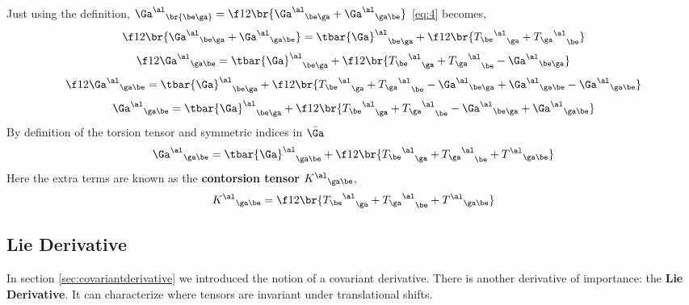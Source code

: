\documentclass{article}
\begin{document}
Just using the definition, ${\Ga^\al}_{\br{\be\ga}} = \f12 \br{{\Ga^\al}_{\be\ga} + {\Ga^\al}_{\ga\be}}$ \eqref{eq:4} becomes,
\[  \f12 \br{{\Ga^\al}_{\be\ga} + {\Ga^\al}_{\ga\be}} = {\tbar{\Ga}^\al}_{\be\ga} + \f12\br{{{T_{\be}}^{\al}}_\ga  + {{T_{\ga}}^{\al}}_\be} \]
\[  \f12 {\Ga^\al}_{\ga\be} = {\tbar{\Ga}^\al}_{\be\ga} + \f12\br{{{T_{\be}}^{\al}}_\ga  + {{T_{\ga}}^{\al}}_\be - {\Ga^\al}_{\be\ga} } \]
\[  \f12 {\Ga^\al}_{\ga\be} = {\tbar{\Ga}^\al}_{\be\ga} + \f12\br{{{T_{\be}}^{\al}}_\ga  + {{T_{\ga}}^{\al}}_\be - {\Ga^\al}_{\be\ga} + {\Ga^\al}_{\ga\be} - {\Ga^\al}_{\ga\be} } \]
\[  {\Ga^\al}_{\ga\be} = {\tbar{\Ga}^\al}_{\be\ga} + \f12\br{{{T_{\be}}^{\al}}_\ga  + {{T_{\ga}}^{\al}}_\be - {\Ga^\al}_{\be\ga} + {\Ga^\al}_{\ga\be} } \]
By definition of the torsion tensor and symmetric indices in $\bar{\Ga}$
\[  {\Ga^\al}_{\ga\be} = {\tbar{\Ga}^\al}_{\ga\be} + \f12\br{{{T_{\be}}^{\al}}_\ga  + {{T_{\ga}}^{\al}}_\be + {T^\al}_{\ga\be} } \]
Here the extra terms are known as the \textbf{contorsion tensor} ${K^{\al}}_{\ga\be}$,
\[{K^{\al}}_{\ga\be} = \f12\br{{{T_{\be}}^{\al}}_\ga  + {{T_{\ga}}^{\al}}_\be + {T^\al}_{\ga\be} } \]
\subsection{Lie Derivative}
\label{sec:liederivative}
In section \eqref{sec:covariantderivative} we introduced the notion of a covariant derivative. There is another derivative of importance: the \textbf{Lie Derivative}. It can characterize where tensors are invariant under translational shifts.\\
\end{document}
